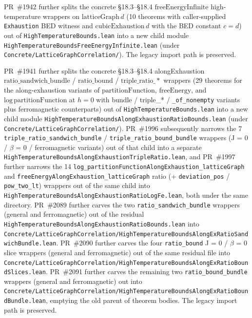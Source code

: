 \documentclass[a4paper,11pt]{article}
\begin{document}
PR~\#1942 further splits the concrete §18.3--§18.4
$\mathrm{freeEnergyInfinite}$ high-temperature wrappers on
$\mathrm{latticeGraph}\,d$ (10 theorems with caller-supplied
\texttt{Exhaustion} BED witness and $\mathrm{cubicExhaustion}\,d$ with
the BED constant $c = d$) out of \texttt{HighTemperatureBounds.lean}
into a new child module
\texttt{HighTemperatureBoundsFreeEnergyInfinite.lean} (under
\texttt{Concrete/LatticeGraphCorrelation/}). The legacy import path is
preserved.

PR~\#1941 further splits the concrete §18.3--§18.4 alongExhaustion
$\mathrm{ratio\_sandwich\_bundle}$ / $\mathrm{ratio\_bound}$ /
$\mathrm{triple\_ratio\_*}$ wrappers (29 theorems for the
along\nobreakdash-exhaustion variants of $\mathrm{partitionFunction}$,
$\mathrm{freeEnergy}$, and
$\mathrm{log}\,\mathrm{partitionFunction}$ at $h = 0$ with bundle
/ triple\_* / \texttt{\_of\_nonempty} variants plus ferromagnetic
counterparts) out of \texttt{HighTemperatureBounds.lean} into a new
child module
\texttt{HighTemperatureBoundsAlongExhaustionRatioBounds.lean} (under
\texttt{Concrete/LatticeGraphCorrelation/}). PR~\#1996 subsequently
narrows the 7 \texttt{triple\_ratio\_sandwich\_bundle} /
\texttt{triple\_ratio\_bound\_bundle} wrappers (J = 0 / $\beta$ = 0 /
ferromagnetic variants) out of that child into a separate
\texttt{HighTemperatureBoundsAlongExhaustionTripleRatio.lean}, and
PR~\#1997 further narrows the 14
\texttt{log\_partitionFunctionAlongExhaustion\_latticeGraph} and
\texttt{freeEnergyAlongExhaustion\_latticeGraph} ratio (+
\texttt{deviation\_pos} / \texttt{pow\_two\_lt}) wrappers out of the
same child into
\texttt{HighTemperatureBoundsAlongExhaustionRatioLogFe.lean}, both
under the same directory.
PR~\#2089 further carves the two
\texttt{ratio\_sandwich\_bundle} wrappers (general and ferromagnetic)
out of the residual
\texttt{HighTemperatureBoundsAlongExhaustionRatioBounds.lean} into
\texttt{Concrete/LatticeGraphCorrelation/HighTemperatureBoundsAlongExRatioSandwichBundle.lean}.
PR~\#2090 further carves the four
\texttt{ratio\_bound} J = 0 / $\beta$ = 0 slice wrappers (general and
ferromagnetic) out of the same residual file into
\texttt{Concrete/LatticeGraphCorrelation/HighTemperatureBoundsAlongExRatioBoundSlices.lean}.
PR~\#2091 further carves the remaining two
\texttt{ratio\_bound\_bundle} wrappers (general and ferromagnetic) out
into
\texttt{Concrete/LatticeGraphCorrelation/HighTemperatureBoundsAlongExRatioBoundBundle.lean},
emptying the old parent of theorem bodies.
The legacy import path is preserved.
\end{document}
